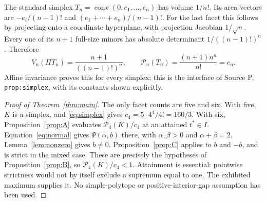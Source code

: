 \documentclass[11pt]{article}
\theoremstyle{remark}\newtheorem{remark}[theorem]{Remark}
\newcommand{\conv}{\operatorname{conv}}
\newcommand{\PP}{\mathcal P}
\numberwithin{equation}{section}
\begin{document}
The standard simplex $T_n=\conv(0,e_1,\ldots,e_n)$ has volume $1/n!$.
Its area vectors are $-e_i/(n-1)!$ and
$(e_1+\cdots+e_n)/(n-1)!$. For the last facet this follows by projecting
onto a coordinate hyperplane, with projection Jacobian $1/\sqrt n$.
Every one of its $n+1$ full-size minors has absolute determinant
$1/((n-1)!)^n$. Therefore
\begin{equation}\label{eq:simplex}
 V_n(\Pi T_n)=\frac{n+1}{((n-1)!)^n},\qquad
 \PP_n(T_n)=\frac{(n+1)n^n}{n!}=c_n.
\end{equation}
Affine invariance proves this for every simplex; this is the interface
of Source P, \texttt{prop:simplex}, with its constants shown explicitly.

\begin{proof}[Proof of Theorem~\ref{thm:main}]
The only facet counts are five and six. With five, $K$ is a simplex,
and \eqref{eq:simplex} gives $c_4=5\cdot4^4/4!=160/3$.
With six, Proposition~\ref{prop:A} evaluates $\PP_4(K)/c_4$ at an
attained $t^*\in I$. Equation~\eqref{eq:normal} gives
$\Psi(\alpha,b)$ there, with $\alpha,\beta>0$ and $\alpha+\beta=2$.
Lemma~\ref{lem:nonzero} gives $b\ne0$.
Proposition~\ref{prop:C} applies to $b$ and $-b$, and is strict in the
mixed case. These are precisely the hypotheses of
Proposition~\ref{prop:B}, so $\PP_4(K)/c_4<1$.
Attainment is essential: pointwise strictness would not by itself
exclude a supremum equal to one. The exhibited maximum supplies it.
No simple-polytope or positive-interior-gap assumption has been used.
\end{proof}
\end{document}
